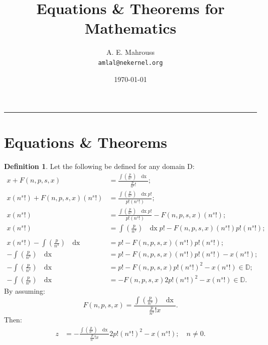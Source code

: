 \documentclass[10pt]{article}
\title{%
  \vspace{-1.5em}%
  \large\textbf{Equations \& Theorems for Mathematics}%
}
\author{A. E. Mahrouss\\\texttt{amlal@nekernel.org}}
\date{\today}
\theoremstyle{plain}
\theoremstyle{definition}
\newtheorem{definition}[theorem]{Definition}
\theoremstyle{remark}
\begin{document}
  \maketitle
\vspace{-0.5em}
\vspace{0.8em}
\rule{\linewidth}{0.4pt}
\vspace{1em}

\section{Equations \& Theorems}

\begin{definition}
	Let the following be defined for any domain D:
\begin{align*}
	x + F(n, p, s, x) &= \frac{\int (\frac{p}{n^{s}}) \text{ } \operatorname{dx}}{\frac{p}{n^{s}}! };\\
	x (n^{s}!) + F(n, p, s, x)(n^{s}!) &= \frac{ {\int (\frac{p}{n^{s}}) \text{ } \operatorname{dx}}{p!}}{p! (n^{s}!)};\\
	x (n^{s}!) &= \frac{ {\int (\frac{p}{n^{s}}) \text{ } \operatorname{dx}}{p!}}{p! (n^{s}!)} - F(n, p, s, x)(n^{s}!);\\
		x (n^{s}!) &= \int (\frac{p}{n^{s}}) \text{ } \operatorname{dx}{p!} - F(n, p, s, x)(n^{s}!) p! (n^{s}!);\\\\
	x (n^{s}!) -\int (\frac{p}{n^{s}}) \text{ } \operatorname{dx} &= p! - F(n, p, s, x)(n^{s}!) p! (n^{s}!);\\
	-\int (\frac{p}{n^{s}}) \text{ } \operatorname{dx} &= p! - F(n, p, s, x)(n^{s}!) p! (n^{s}!) - x (n^{s}!);\\
	-\int (\frac{p}{n^{s}})\text{ } \operatorname{dx} &= p! - F(n, p, s, x)p!(n^{s}!)^{2} - x (n^{s}!) \in \mathbb{D};\\
	-\int (\frac{p}{n^{s}})\text{ } \operatorname{dx} &= - F(n, p, s, x)2p!(n^{s}!)^{2} - x (n^{s}!) \in \mathbb{D}.
\end{align*}
By assuming:
\begin{equation}
	F(n, p, s, x) = \frac{\int (\frac{p}{n^{s}}) \text{ } \operatorname{dx}}{\frac{p}{n^{s}}! x }.
\end{equation}
Then:
\begin{align*}
	z &= - \frac{\int (\frac{p}{n^{s}}) \text{ } \operatorname{dx}}{\frac{p}{n^{s}}! x } 2p!(n^{s}!)^{2} - x (n^{s}!); \quad n\neq 0.
\end{align*}
\end{definition}

\nocite{*}



\end{document}
